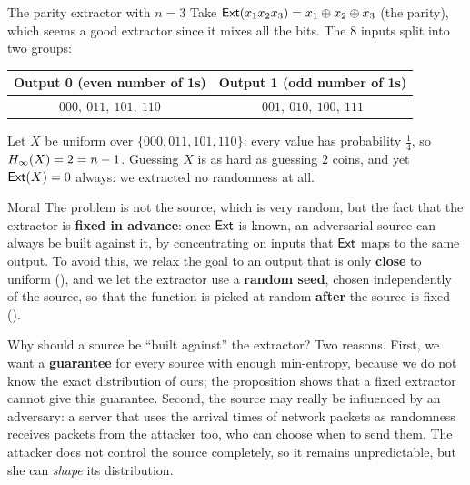 \begin{framedex}{The parity extractor with $n = 3$}
  Take $\mathsf{Ext}(x_1 x_2 x_3) = x_1 \oplus x_2 \oplus x_3$ (the parity), which seems a good extractor since it mixes all the bits. The $8$ inputs split into two groups:
  \begin{center}
    \begin{tabular}{cc}
      \toprule
      \textbf{Output 0 (even number of 1s)} & \textbf{Output 1 (odd number of 1s)} \\
      \midrule
      $000,\ 011,\ 101,\ 110$ & $001,\ 010,\ 100,\ 111$ \\
      \bottomrule
    \end{tabular}
  \end{center}
  Let $X$ be uniform over $\{000, 011, 101, 110\}$: every value has probability $\frac{1}{4}$, so $H_\infty(X) = 2 = n - 1$. Guessing $X$ is as hard as guessing $2$ coins, and yet $\mathsf{Ext}(X) = 0$ always: we extracted no randomness at all.
\end{framedex}

\begin{framedobs}{Moral}
  The problem is not the source, which is very random, but the fact that the extractor is \textbf{fixed in advance}: once $\mathsf{Ext}$ is known, an adversarial source can always be built against it, by concentrating on inputs that $\mathsf{Ext}$ maps to the same output. To avoid this, we relax the goal to an output that is only \textbf{close} to uniform (), and we let the extractor use a \textbf{random seed}, chosen independently of the source, so that the function is picked at random \textbf{after} the source is fixed ().
\end{framedobs}

Why should a source be ``built against'' the extractor? Two reasons. First, we want a \textbf{guarantee} for every source with enough min-entropy, because we do not know the exact distribution of ours; the proposition shows that a fixed extractor cannot give this guarantee. Second, the source may really be influenced by an adversary: a server that uses the arrival times of network packets as randomness receives packets from the attacker too, who can choose when to send them. The attacker does not control the source completely, so it remains unpredictable, but she can \textit{shape} its distribution.

